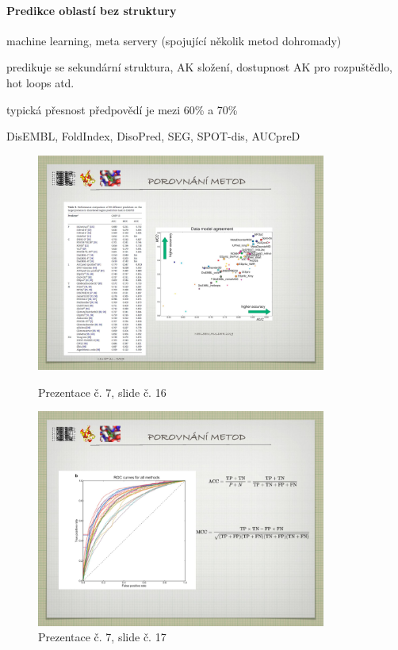 \documentclass[DIV=8]{scrreprt}
\begin{document}
\paragraph{Predikce oblastí bez struktury}
\begin{myItemize}[nosep]
    \item machine learning, meta servery (spojující několik metod dohromady)
    \item predikuje se sekundární struktura, AK složení, dostupnost AK pro rozpuštědlo, hot loops atd.
    \item typická přesnost předpovědí je mezi 60\% a 70\%
    \item DisEMBL, FoldIndex, DisoPred, SEG, SPOT-dis, AUCpreD \begin{figure}
    \caption{Prezentace č. 7, slide č. 16}
    \includegraphics[width=0.85\textwidth]{slides-7/slide-16.jpg}
    \centering
    \label{slides-7-slide-16}
\end{figure}
\begin{figure}
    \caption{Prezentace č. 7, slide č. 17}
    \includegraphics[width=0.85\textwidth]{slides-7/slide-17.jpg}

\end{figure}
\end{myItemize}
\end{document}
